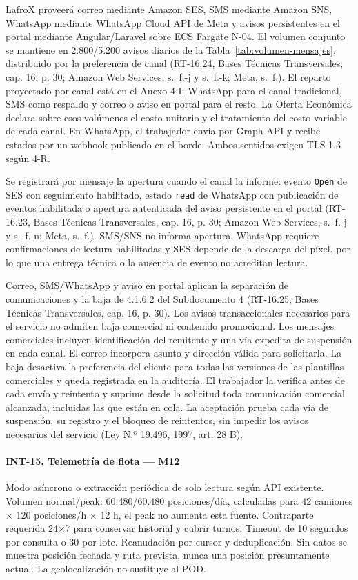 LafroX proveerá correo mediante Amazon SES, SMS mediante Amazon SNS, WhatsApp mediante WhatsApp Cloud API de Meta y avisos persistentes en el portal mediante Angular/Laravel sobre ECS Fargate N-04. El volumen conjunto se mantiene en 2.800/5.200 avisos diarios de la Tabla~\ref{tab:volumen-mensajes}, distribuido por la preferencia de canal (RT-16.24, Bases Técnicas Transversales, cap. 16, p. 30; Amazon Web Services, s.~f.-j y s.~f.-k; Meta, s.~f.). El reparto proyectado por canal está en el Anexo 4-I: WhatsApp para el canal tradicional, SMS como respaldo y correo o aviso en portal para el resto. La Oferta Económica declara sobre esos volúmenes el costo unitario y el tratamiento del costo variable de cada canal. En WhatsApp, el trabajador envía por Graph API y recibe estados por un webhook publicado en el borde. Ambos sentidos exigen TLS 1.3 según 4-R.

Se registrará por mensaje la apertura cuando el canal la informe: evento \texttt{Open} de SES con seguimiento habilitado, estado \texttt{read} de WhatsApp con publicación de eventos habilitada o apertura autenticada del aviso persistente en el portal (RT-16.23, Bases Técnicas Transversales, cap. 16, p. 30; Amazon Web Services, s.~f.-j y s.~f.-n; Meta, s.~f.). SMS/SNS no informa apertura. WhatsApp requiere confirmaciones de lectura habilitadas y SES depende de la descarga del píxel, por lo que una entrega técnica o la ausencia de evento no acreditan lectura.

Correo, SMS/WhatsApp y aviso en portal aplican la separación de comunicaciones y la baja de 4.1.6.2 del Subdocumento 4 (RT-16.25, Bases Técnicas Transversales, cap. 16, p. 30). Los avisos transaccionales necesarios para el servicio no admiten baja comercial ni contenido promocional. Los mensajes comerciales incluyen identificación del remitente y una vía expedita de suspensión en cada canal. El correo incorpora asunto y dirección válida para solicitarla. La baja desactiva la preferencia del cliente para todas las versiones de las plantillas comerciales y queda registrada en la auditoría. El trabajador la verifica antes de cada envío y reintento y suprime desde la solicitud toda comunicación comercial alcanzada, incluidas las que están en cola. La aceptación prueba cada vía de suspensión, su registro y el bloqueo de reintentos, sin impedir los avisos necesarios del servicio (Ley N.º 19.496, 1997, art. 28 B).

\paragraph{INT-15. Telemetría de flota — M12}
Modo asíncrono o extracción periódica de solo lectura según API existente. Volumen normal/peak: 60.480/60.480 posiciones/día, calculadas para 42 camiones × 120 posiciones/h × 12 h, el peak no aumenta esta fuente. Contraparte requerida 24$\times$7 para conservar historial y cubrir turnos. Timeout de 10 segundos por consulta o 30 por lote. Reanudación por cursor y deduplicación. Sin datos se muestra posición fechada y ruta prevista, nunca una posición presuntamente actual. La geolocalización no sustituye al POD.

